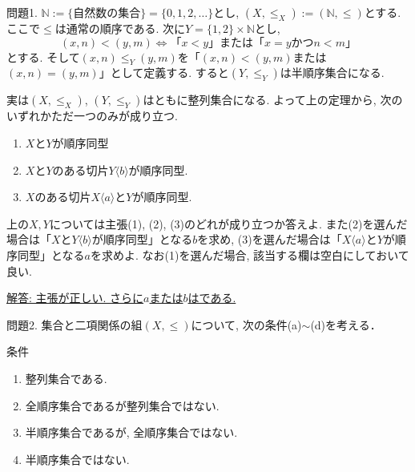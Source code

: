 \documentclass[dvipdfmx,a4paper,11pt]{article}
\newcommand{\N}{\mathbb{N}}
\theoremstyle{definition}
\begin{document}
 問題1. $\N:= \{ \text{自然数の集合}\} = \{ 0,1,2,\ldots\}$とし, $(X, \le_X):=(\N, \le)$とする. ここで$\le$は通常の順序である. 
 次に$Y=\{ 1, 2 \} \times \N$とし, 
 $$
 (x, n) < (y, m)
 \Longleftrightarrow
 \text{「$x<y$」} \text{または}
  \text{「$x=y$かつ$n < m$」} 
 $$
 とする. そして$(x, n) \le_Y (y, m)$を「$(x, n) <(y, m)$または$(x,n)=(y,m)$」として定義する.
 すると$(Y,\le_Y)$は半順序集合になる.
 
実は$(X, \le_X)$, $(Y, \le_Y)$はともに整列集合になる. 
 よって上の定理から, 次のいずれかただ一つのみが成り立つ. 
  \begin{enumerate}[label=主張(\arabic*).]
 \setlength{\parskip}{0cm}
  \setlength{\itemsep}{0pt}
  \item $X$と$Y$が順序同型
  \item $X$と$Y$のある切片$Y\langle b\rangle$が順序同型.
  \item $X$のある切片$X\langle a\rangle$と$Y$が順序同型.
 \end{enumerate}

上の$X,Y$については主張(1), (2), (3)のどれが成り立つか答えよ. 
また(2)を選んだ場合は「$X$と$Y\langle b\rangle$が順序同型」となる$b$を求め, 
(3)を選んだ場合は「$X\langle a\rangle$と$Y$が順序同型」となる$a$を求めよ.
なお(1)を選んだ場合, 該当する欄は空白にしておいて良い.

\vspace{5pt}
{ \large \underline{解答: 主張\hspace{2cm}が正しい. さらに$a$または$b$は\hspace{2cm}である.} }
  
\newpage

問題2. 集合と二項関係の組$(X, \le)$について, 次の条件(a)$\sim$(d)を考える．

 \begin{itembox}[l]{条件}
\begin{enumerate}[label=(\alph*).]
 \setlength{\parskip}{0cm}
  \setlength{\itemsep}{0pt}
 \item 整列集合である.
 \item 全順序集合であるが整列集合ではない.
 \item 半順序集合であるが, 全順序集合ではない. 
 \item 半順序集合ではない.
\end{enumerate}
\end{itembox}
\end{document}
